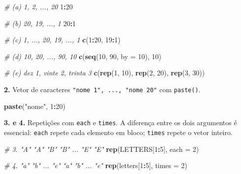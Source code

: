 \documentclass[
  portuguese,
  11pt,
  openany]{book}
\newenvironment{Shaded}{\begin{snugshade}}{\end{snugshade}}
\newcommand{\AttributeTok}[1]{\textcolor[rgb]{0.13,0.29,0.53}{#1}}
\newcommand{\CommentTok}[1]{\textcolor[rgb]{0.56,0.35,0.01}{\textit{#1}}}
\newcommand{\DecValTok}[1]{\textcolor[rgb]{0.00,0.00,0.81}{#1}}
\newcommand{\FunctionTok}[1]{\textcolor[rgb]{0.13,0.29,0.53}{\textbf{#1}}}
\newcommand{\NormalTok}[1]{#1}
\newcommand{\SpecialCharTok}[1]{\textcolor[rgb]{0.81,0.36,0.00}{\textbf{#1}}}
\newcommand{\StringTok}[1]{\textcolor[rgb]{0.31,0.60,0.02}{#1}}
\begin{document}
\begin{Shaded}
\begin{Highlighting}[]
\CommentTok{\# (a) 1, 2, ..., 20}
\DecValTok{1}\SpecialCharTok{:}\DecValTok{20}

\CommentTok{\# (b) 20, 19, ..., 1}
\DecValTok{20}\SpecialCharTok{:}\DecValTok{1}

\CommentTok{\# (c) 1, ..., 20, 19, ..., 1}
\FunctionTok{c}\NormalTok{(}\DecValTok{1}\SpecialCharTok{:}\DecValTok{20}\NormalTok{, }\DecValTok{19}\SpecialCharTok{:}\DecValTok{1}\NormalTok{)}

\CommentTok{\# (d) 10, 20, ..., 90, 10}
\FunctionTok{c}\NormalTok{(}\FunctionTok{seq}\NormalTok{(}\DecValTok{10}\NormalTok{, }\DecValTok{90}\NormalTok{, }\AttributeTok{by =} \DecValTok{10}\NormalTok{), }\DecValTok{10}\NormalTok{)}

\CommentTok{\# (e) dez 1, vinte 2, trinta 3}
\FunctionTok{c}\NormalTok{(}\FunctionTok{rep}\NormalTok{(}\DecValTok{1}\NormalTok{, }\DecValTok{10}\NormalTok{), }\FunctionTok{rep}\NormalTok{(}\DecValTok{2}\NormalTok{, }\DecValTok{20}\NormalTok{), }\FunctionTok{rep}\NormalTok{(}\DecValTok{3}\NormalTok{, }\DecValTok{30}\NormalTok{))}
\end{Highlighting}
\end{Shaded}

\textbf{2.} Vetor de caracteres \texttt{"nome\ 1",\ ...,\ "nome\ 20"} com \texttt{paste()}.

\begin{Shaded}
\begin{Highlighting}[]
\FunctionTok{paste}\NormalTok{(}\StringTok{"nome"}\NormalTok{, }\DecValTok{1}\SpecialCharTok{:}\DecValTok{20}\NormalTok{)}
\end{Highlighting}
\end{Shaded}

\textbf{3. e 4.} Repetições com \texttt{each} e \texttt{times}. A diferença entre os dois argumentos
é essencial: \texttt{each} repete cada elemento em bloco; \texttt{times} repete o vetor
inteiro.

\begin{Shaded}
\begin{Highlighting}[]
\CommentTok{\# 3. "A" "A" "B" "B" ... "E" "E"}
\FunctionTok{rep}\NormalTok{(LETTERS[}\DecValTok{1}\SpecialCharTok{:}\DecValTok{5}\NormalTok{], }\AttributeTok{each =} \DecValTok{2}\NormalTok{)}

\CommentTok{\# 4. "a" "b" ... "e" "a" "b" ... "e"}
\FunctionTok{rep}\NormalTok{(letters[}\DecValTok{1}\SpecialCharTok{:}\DecValTok{5}\NormalTok{], }\AttributeTok{times =} \DecValTok{2}\NormalTok{)}
\end{Highlighting}
\end{Shaded}
\end{document}
